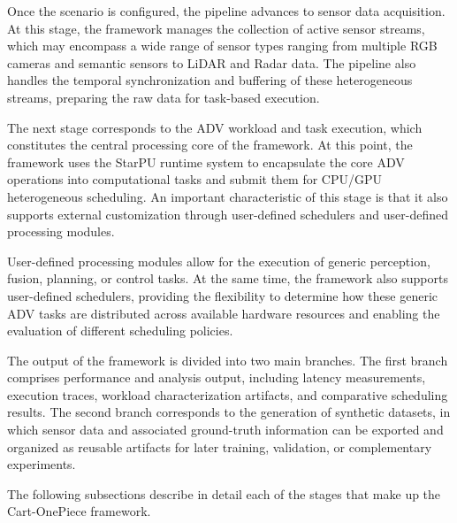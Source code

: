 Once the scenario is configured, the pipeline advances to sensor data acquisition. At this stage, the framework manages the collection of active sensor streams, which may encompass a wide range of sensor types ranging from multiple RGB cameras and semantic sensors to LiDAR and Radar data. The pipeline also handles the temporal synchronization and buffering of these heterogeneous streams, preparing the raw data for task-based execution.

The next stage corresponds to the ADV workload and task execution, which constitutes the central processing core of the framework.  At this point, the framework uses the StarPU runtime system to encapsulate the core ADV operations into computational tasks and submit them for CPU/GPU heterogeneous scheduling. An important characteristic of this stage is that it also supports external customization through user-defined schedulers and user-defined processing modules.

User-defined processing modules allow for the execution of generic perception, fusion, planning, or control tasks. At the same time, the framework also supports user-defined schedulers, providing the flexibility to determine how these generic ADV tasks are distributed across available hardware resources and enabling the evaluation of different scheduling policies.

The output of the framework is divided into two main branches. The first branch comprises performance and analysis output, including latency measurements, execution traces, workload characterization artifacts, and comparative scheduling results. The second branch corresponds to the generation of synthetic datasets, in which sensor data and associated ground-truth information can be exported and organized as reusable artifacts for later training, validation, or complementary experiments.

The following subsections describe in detail each of the stages that make up the Cart-OnePiece framework.